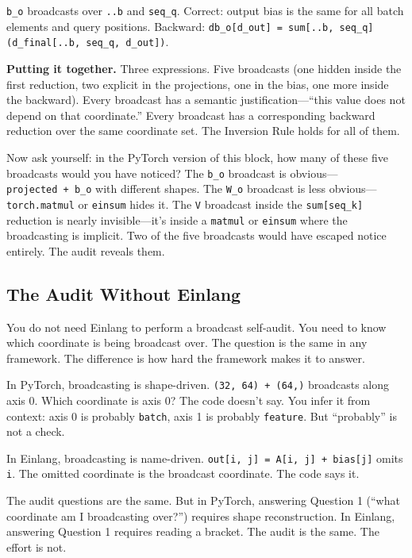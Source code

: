 \documentclass[11pt,titlepage]{article}
\begin{document}
\texttt{b\_o} broadcasts over \texttt{..b} and \texttt{seq\_q}. Correct:
output bias is the same for all batch elements and query positions.
Backward:
\texttt{db\_o{[}d\_out{]}\ =\ sum{[}..b,\ seq\_q{]}(d\_final{[}..b,\ seq\_q,\ d\_out{]})}.

\textbf{Putting it together.} Three expressions. Five broadcasts (one
hidden inside the first reduction, two explicit in the projections, one
in the bias, one more inside the backward). Every broadcast has a
semantic justification---``this value does not depend on that
coordinate.'' Every broadcast has a corresponding backward reduction
over the same coordinate set. The Inversion Rule holds for all of them.

Now ask yourself: in the PyTorch version of this block, how many of
these five broadcasts would you have noticed? The \texttt{b\_o}
broadcast is obvious---\texttt{projected\ +\ b\_o} with different
shapes. The \texttt{W\_o} broadcast is less
obvious---\texttt{torch.matmul} or \texttt{einsum} hides it. The
\texttt{V} broadcast inside the \texttt{sum{[}seq\_k{]}} reduction is
nearly invisible---it's inside a \texttt{matmul} or \texttt{einsum}
where the broadcasting is implicit. Two of the five broadcasts would
have escaped notice entirely. The audit reveals them.

\vspace{2em}

\hypertarget{the-audit-without-einlang}{%
\subsection{The Audit Without Einlang}\label{the-audit-without-einlang}}

You do not need Einlang to perform a broadcast self-audit. You need to
know which coordinate is being broadcast over. The question is the same
in any framework. The difference is how hard the framework makes it to
answer.

In PyTorch, broadcasting is shape-driven. \texttt{(32,\ 64)\ +\ (64,)}
broadcasts along axis 0. Which coordinate is axis 0? The code doesn't
say. You infer it from context: axis 0 is probably \texttt{batch}, axis
1 is probably \texttt{feature}. But ``probably'' is not a check.

In Einlang, broadcasting is name-driven.
\texttt{out{[}i,\ j{]}\ =\ A{[}i,\ j{]}\ +\ bias{[}j{]}} omits
\texttt{i}. The omitted coordinate is the broadcast coordinate. The code
says it.

The audit questions are the same. But in PyTorch, answering Question 1
(``what coordinate am I broadcasting over?'') requires shape
reconstruction. In Einlang, answering Question 1 requires reading a
bracket. The audit is the same. The effort is not.
\end{document}
